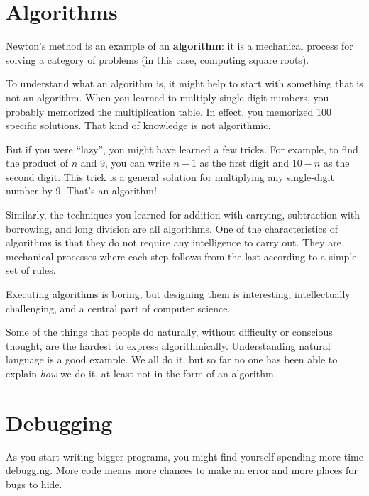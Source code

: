 \documentclass[10pt]{book}
\begin{document}
\section{Algorithms}

Newton's method is an example of an {\bf algorithm}: it is a
mechanical process for solving a category of problems (in this
case, computing square roots).

To understand what an algorithm is, it might help to start with
something that is not an algorithm.  When you learned to multiply
single-digit numbers, you probably memorized the multiplication table.
In effect, you memorized 100 specific solutions.  That kind of
knowledge is not algorithmic.

But if you were ``lazy'', you might have learned a few
tricks.  For example, to find the product of $n$ and 9, you can
write $n-1$ as the first digit and $10-n$ as the second
digit.  This trick is a general solution for multiplying any
single-digit number by 9.  That's an algorithm!

Similarly, the techniques you learned for addition with carrying,
subtraction with borrowing, and long division are all algorithms.  One
of the characteristics of algorithms is that they do not require any
intelligence to carry out.  They are mechanical processes where
each step follows from the last according to a simple set of rules.

Executing algorithms is boring, but designing them is interesting,
intellectually challenging, and a central part of computer science.

Some of the things that people do naturally, without difficulty or
conscious thought, are the hardest to express algorithmically.
Understanding natural language is a good example.  We all do it, but
so far no one has been able to explain {\em how} we do it, at least
not in the form of an algorithm.


\section{Debugging}
\label{bisectbug}

As you start writing bigger programs, you might find yourself
spending more time debugging.  More code means more chances to
make an error and more places for bugs to hide.
\end{document}
